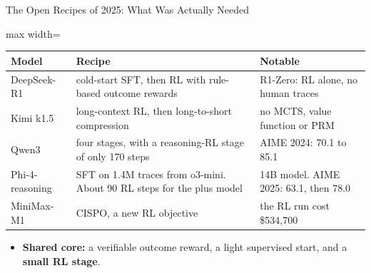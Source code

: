 \begin{frame}{The Open Recipes of 2025: What Was Actually Needed}
    \begin{center}
    \footnotesize
    \renewcommand{\arraystretch}{1.0}
    \begin{adjustbox}{max width=\linewidth}\begin{tabular}{>{\raggedright\arraybackslash}p{2.4cm}>{\raggedright\arraybackslash}p{6.6cm}>{\raggedright\arraybackslash}p{4.8cm}}
        \toprule
        \textbf{Model} & \textbf{Recipe} & \textbf{Notable} \\
        \midrule
        DeepSeek-R1 & cold-start SFT, then RL with rule-based outcome rewards & R1-Zero: RL alone, no human traces \\
        Kimi k1.5 & long-context RL, then long-to-short compression & no MCTS, value function or PRM \\
        \rowcolor{KAUSTcyan!12} Qwen3 & four stages, with a reasoning-RL stage of only 170 steps & AIME 2024: 70.1 to 85.1 \\
        Phi-4-reasoning & SFT on 1.4M traces from o3-mini. About 90 RL steps for the plus model & 14B model. AIME 2025: 63.1, then 78.0 \\
        MiniMax-M1 & CISPO, a new RL objective & the RL run cost \$534,700 \\
        \bottomrule
    \end{tabular}\end{adjustbox}
    \end{center}
    \begin{itemize}\itemsep0.3em
        \item \textbf{Shared core:} a verifiable outcome reward, a light supervised start, and a \textbf{small RL stage}.
    \end{itemize}
\end{frame}

